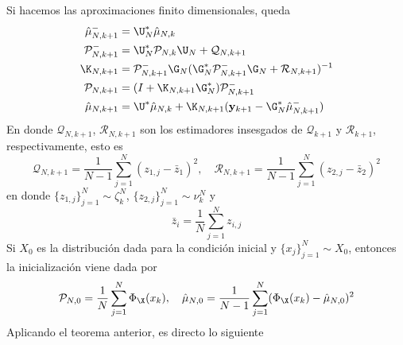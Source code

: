    Si hacemos las aproximaciones finito dimensionales, queda
\begin{equation*}
	\begin{aligned}
		\hat{\mu}_{N, k+1}^- & = \U^*_N \hat{\mu}_{N, k} \\
		\mathcal{P}_{N, k+1}^- & = \U^*_N \mathcal{P}_{N,k} \U_N + \mathcal{Q}_{N, k+1} \\
		\K_{N,k+1} & = \mathcal{P}_{N, k+1}^- \G_N (\G^*_N \mathcal{P}_{N, k+1}^- \G_N + \mathcal{R}_{N, k+1})^{-1} \\
		\mathcal{P}_{N, k+1} & = (I + \K_{N,k+1} \G_N^*) \mathcal{P}_{N,k+1}^- \\
		\hat{\mu}_{N,k+1} &= \U^* \hat{\mu}_{N,k} + \K_{N,k+1} (\mathbf{y}_{k+1} - \G^*_N \hat{\mu}_{N,k+1}^-)
	\end{aligned}
\end{equation*}
    En donde $\mathcal{Q}_{N,k+1}$, $\mathcal{R}_{N,k+1}$ son los estimadores insesgados de $\mathcal{Q}_{k+1}$ y $\mathcal{R}_{k+1}$, respectivamente, esto es
\begin{equation*}
	\mathcal{Q}_{N,k+1} = \frac{1}{N-1}\sum_{j=1}^N (z_{1,j} - \bar{z}_1)^2, \quad \mathcal{R}_{N,k+1} = \frac{1}{N-1}\sum_{j=1}^N (z_{2,j} - \bar{z}_2)^2
\end{equation*}
en donde $\{ z_{1,j} \}_{j=1}^N \sim \zeta_k^N$, $\{ z_{2,j} \}_{j=1}^N \sim \nu_k^N$ y 
\begin{equation*}
	\bar{z}_i = \frac{1}{N} \sum_{j=1}^N z_{i,j}
\end{equation*}
Si $X_0$ es la distribución dada para la condición inicial y $\{ x_j \}_{j=1}^N \sim X_0$, entonces la inicialización viene dada por
\begin{equation*}
	\mathcal{P}_{N,0} = \frac{1}{N} \sum_{j=1}^N \Phi_\X(x_{k}), \quad \hat{\mu}_{N,0} = \frac{1}{N-1} \sum_{j=1}^N (\Phi_\X(x_{k}) - \hat{\mu}_{N,0})^2
\end{equation*}
Aplicando el teorema anterior, es directo lo siguiente
